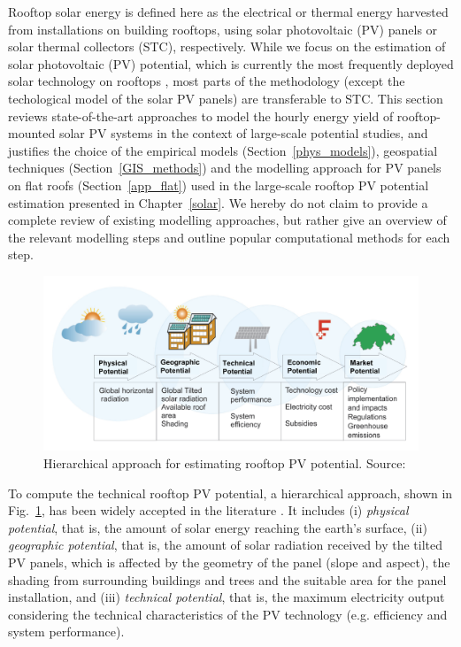 Rooftop solar energy is defined here as the electrical or thermal energy harvested from installations on building rooftops, using solar photovoltaic (PV) panels or solar thermal collectors (STC), respectively. 
While we focus on the estimation of solar photovoltaic (PV) potential, which is currently the most frequently deployed solar technology on rooftops \cite{kaufmann_schweizerische_2017}, most parts of the methodology (except the techological model of the solar PV panels) are transferable to STC. 
This section reviews state-of-the-art approaches to model the hourly energy yield of rooftop-mounted solar PV systems in the context of large-scale potential studies, and justifies the choice of the empirical models (Section~\ref{phys_models}), geospatial techniques (Section~\ref{GIS_methods}) and the modelling approach for PV panels on flat roofs (Section~\ref{app_flat}) used in the large-scale rooftop PV potential estimation presented in Chapter~\ref{solar}. We hereby do not claim to provide a complete review of existing modelling approaches, but rather give an overview of the relevant modelling steps and outline popular computational methods for each step.

\begin{figure}[tb]
	\centering
	\includegraphics[width=\linewidth]{images/Figs/hierarchy.png}  
	\caption{Hierarchical approach for estimating rooftop PV potential. Source: \citet{assouline_estimation_2017}}
	\label{fig:solar_hierarchy}
\end{figure}

To compute the technical rooftop PV potential,  a hierarchical approach, shown in Fig.~\ref{fig:solar_hierarchy}, has been widely accepted in the literature \cite{assouline_quantifying_2017,ramirez_camargo_spatio-temporal_2015,izquierdo_method_2008,wiginton_quantifying_2010}. It includes (i) \textit{physical potential}, that is, the amount of solar energy reaching the earth’s surface, (ii) \textit{geographic potential}, that is, the amount of solar radiation received by the tilted PV panels, which is affected by the geometry of the panel (slope and aspect), the shading from surrounding buildings and trees and the suitable area for the panel installation, and (iii) \textit{technical potential}, that is, the maximum electricity output considering the technical characteristics of the PV technology (e.g. efficiency and system performance).

